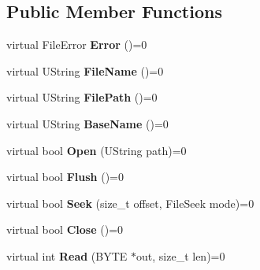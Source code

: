 \subsection*{Public Member Functions}
\begin{DoxyCompactItemize}
\item 
\hypertarget{class_vixen_1_1_i_file_a5918065a61d316d170d5b20f46a7a770}{}virtual File\+Error {\bfseries Error} ()=0\label{class_vixen_1_1_i_file_a5918065a61d316d170d5b20f46a7a770}

\item 
\hypertarget{class_vixen_1_1_i_file_a23244672c3e59af8dfdfd77fe6df992b}{}virtual U\+String {\bfseries File\+Name} ()=0\label{class_vixen_1_1_i_file_a23244672c3e59af8dfdfd77fe6df992b}

\item 
\hypertarget{class_vixen_1_1_i_file_aed9fd463648dbd5a5de9310711e9206b}{}virtual U\+String {\bfseries File\+Path} ()=0\label{class_vixen_1_1_i_file_aed9fd463648dbd5a5de9310711e9206b}

\item 
\hypertarget{class_vixen_1_1_i_file_a5f50dba2f5efaa1b5438b9924dad8d85}{}virtual U\+String {\bfseries Base\+Name} ()=0\label{class_vixen_1_1_i_file_a5f50dba2f5efaa1b5438b9924dad8d85}

\item 
\hypertarget{class_vixen_1_1_i_file_a719f5df723010adfcaaf2ef6fc02e414}{}virtual bool {\bfseries Open} (U\+String path)=0\label{class_vixen_1_1_i_file_a719f5df723010adfcaaf2ef6fc02e414}

\item 
\hypertarget{class_vixen_1_1_i_file_a64d455adfd53b5395ced42605aa77186}{}virtual bool {\bfseries Flush} ()=0\label{class_vixen_1_1_i_file_a64d455adfd53b5395ced42605aa77186}

\item 
\hypertarget{class_vixen_1_1_i_file_af1ebf5771acc6e8553797614de65dfd2}{}virtual bool {\bfseries Seek} (size\+\_\+t offset, File\+Seek mode)=0\label{class_vixen_1_1_i_file_af1ebf5771acc6e8553797614de65dfd2}

\item 
\hypertarget{class_vixen_1_1_i_file_ae22fba81f1a450f94bbaa993e342d28b}{}virtual bool {\bfseries Close} ()=0\label{class_vixen_1_1_i_file_ae22fba81f1a450f94bbaa993e342d28b}

\item 
\hypertarget{class_vixen_1_1_i_file_af32436aa486d7498f7fa51b7fa45b14d}{}virtual int {\bfseries Read} (B\+Y\+T\+E $\ast$out, size\+\_\+t len)=0\label{class_vixen_1_1_i_file_af32436aa486d7498f7fa51b7fa45b14d}


\end{DoxyCompactItemize}

